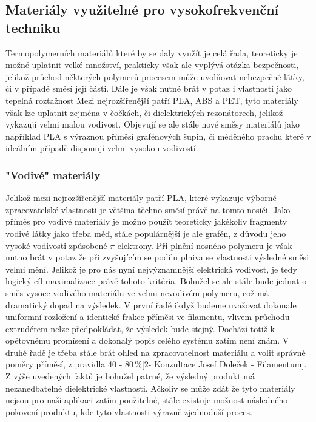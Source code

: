 \subsection{Materiály využitelné pro vysokofrekvenční techniku}
Termopolymerních materiálů které by se daly využít je celá řada, teoreticky je možné uplatnit velké množství, prakticky však ale vyplývá otázka bezpečnosti, jelikož průchod některých polymerů procesem může uvolňovat nebezpečné látky, či v případě směsí její části. Dále je však nutné brát v potaz i vlastnosti jako tepelná roztažnost 
Mezi nejrozšířenější patří PLA, ABS a PET, tyto materiály však lze uplatnit zejména v čočkách, či dielektrických rezonátorech, jelikož vykazují velmi malou vodivost. Objevují se ale stále nové směsy materiálů jako například PLA s výraznou příměsí grafénových šupin, či měděného prachu které v ideálním případě disponují velmi vysokou vodivostí.

\subsubsection{"Vodivé" materiály}
Jelikož mezi nejrozšířenější materiály patří PLA, které vykazuje výborné zpracovatelské vlastnosti je většina těchno směsí právě na tomto nosiči.
Jako příměs pro vodivé materiály je možno použít teoreticky jakékoliv fragmenty vodivé látky jako třeba měď, stále populárnější je ale grafén, z důvodu jeho vysoké vodivosti způsobené $\pi$ elektrony. Při plnění nosného polymeru je však nutno brát v potaz že při zvyšujícím se podílu plniva se vlastnosti výsledné směsi velmi mění.
Jelikož je pro nás nyní nejvýznamnější elektrická vodivost, je tedy logický cíl maximalizace právě tohoto kritéria. Bohužel se ale stále bude jednat o směs vysoce vodivého materiálu ve velmi nevodivém polymeru, což má dramatický dopad na výsledek. V první řadě ikdyž budeme uvažovat dokonale uniformní rozložení a identické frakce příměsi ve filamentu, vlivem průchodu extrudérem nelze předpokládat, že výsledek bude stejný. Dochází totiž k opětovnému promísení a dokonalý popis celého systému zatím není znám. V druhé řadě je třeba stále brát ohled na zpracovatelnost materiálu a volit správné poměry příměsí, z pravidla 40 - 80\,\%[2- Konzultace Josef Doleček - Filamentum]. Z výše uvedených faktů je bohužel patrné, že výsledný produkt má nezanedbatelné dielektrické vlastnosti.
Ačkoliv se může zdát že tyto materiály nejsou pro naši aplikaci zatím použitelné, stále existuje možnost následného pokovení produktu, kde tyto vlastnosti výrazně zjednoduší proces.

